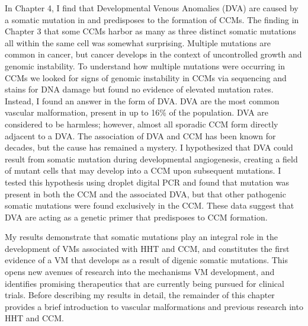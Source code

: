 In Chapter 4, I find that Developmental Venous Anomalies (DVA) are caused by a somatic mutation in  and predisposes to the formation of CCMs. The finding in Chapter 3 that some CCMs harbor as many as three distinct somatic mutations all within the same cell was somewhat surprising. Multiple mutations are common in cancer, but cancer develops in the context of uncontrolled growth and genomic instability. To understand how multiple mutations were occurring in CCMs we looked for signs of genomic instability in CCMs via sequencing and stains for DNA damage but found no evidence of elevated mutation rates. Instead, I found an answer in the form of DVA. DVA are the most common vascular malformation, present in up to 16\% of the population. DVA are considered to be harmless; however, almost all sporadic CCM form directly adjacent to a DVA. The association of DVA and CCM has been known for decades, but the cause has remained a mystery. I hypothesized that DVA could result from somatic  mutation during developmental angiogenesis, creating a field of mutant cells that may develop into a CCM upon subsequent mutations. I tested this hypothesis using droplet digital PCR and found that  mutation was present in both the CCM and the associated DVA, but that other pathogenic somatic mutations were found exclusively in the CCM. These data suggest that DVA are acting as a genetic primer that predisposes to CCM formation.

My results demonstrate that somatic mutations play an integral role in the development of VMs associated with HHT and CCM, and constitutes the first evidence of a VM that develops as a result of digenic somatic mutations. This opens new avenues of research into the mechanisms VM development, and identifies promising therapeutics that are currently being pursued for clinical trials. Before describing my results in detail, the remainder of this chapter provides a brief introduction to vascular malformations and previous research into HHT and CCM.




